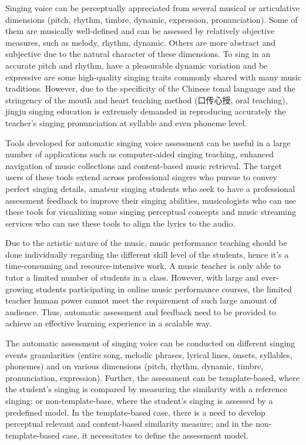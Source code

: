 Singing voice can be perceptually appreciated from several musical or articulative dimensions (pitch, rhythm, timbre, dynamic, expression, pronunciation). Some of them are musically well-defined and can be assessed by relatively objective measures, such as melody, rhythm, dynamic. Others are more abstract and subjective due to the natural character of these dimensions. To sing in an accurate pitch and rhythm, have a pleasurable dynamic variation and be expressive are some high-quality singing traits commonly shared with many music traditions. However, due to the specificity of the Chinese tonal language and the stringency of the mouth and heart teaching method (口传心授, oral teaching), jingju singing education is extremely demanded in reproducing accurately the teacher's singing pronunciation at syllable and even phoneme level.

Tools developed for automatic singing voice assessment can be useful in a large number of applications such as computer-aided singing teaching, enhanced navigation of music collections and content-based music retrieval. The target users of these tools extend across professional singers who pursue to convey perfect singing details, amateur singing students who seek to have a professional assessment feedback to improve their singing abilities, musicologists who can use these tools for visualizing some singing perceptual concepts and music streaming services who can use these tools to align the lyrics to the audio.

Due to the artistic nature of the music, music performance teaching should be done individually regarding the different skill level of the students, hence it's a time-consuming and resource-intensive work. A music teacher is only able to tutor a limited number of students in a class. However, with large and ever-growing students participating in online music performance courses, the limited teacher human power cannot meet the requirement of such large amount of audience. Thus, automatic assessment and feedback need to be provided to achieve an effective learning experience in a scalable way. 

The automatic assessment of singing voice can be conducted on different singing events granularities (entire song, melodic phrases, lyrical lines, onsets, syllables, phonemes) and on various dimensions (pitch, rhythm, dynamic, timbre, pronunciation, expression). Further, the assessment can be template-based, where the student's singing is compared by measuring the similarity with a reference singing; or non-template-base, where the student's singing is assessed by a predefined model. In the template-based case, there is a need to develop perceptual relevant and content-based similarity measure; and in the non-template-based case, it necessitates to define the assessment model.

